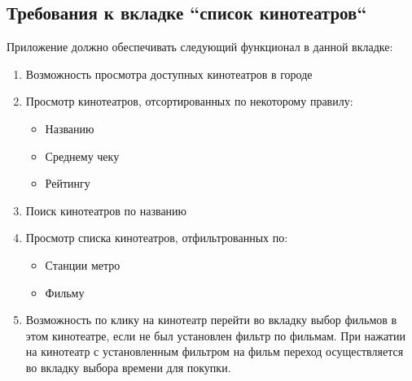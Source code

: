 \documentclass[a4paper,16pt]{article}
\begin{document}
\subsection{Требования к вкладке ``список кинотеатров``}
Приложение должно обеспечивать следующий функционал в данной вкладке:
\begin{enumerate}
    \item Возможность просмотра доступных кинотеатров в городе
    \item Просмотр кинотеатров, отсортированных по некоторому правилу:
        \begin{itemize}
            \item Названию
            \item Среднему чеку
            \item Рейтингу
        \end{itemize}
    \item Поиск кинотеатров по названию
    \item Просмотр списка кинотеатров, отфильтрованных по:
        \begin{itemize}
            \item Станции метро
            \item Фильму
        \end{itemize}
    \item Возможность по клику на кинотеатр перейти во вкладку выбор фильмов в этом кинотеатре, если не был установлен фильтр по фильмам. При нажатии на кинотеатр с установленным фильтром на фильм переход осуществляется во вкладку выбора времени для покупки.  
\end{enumerate}
\end{document}
